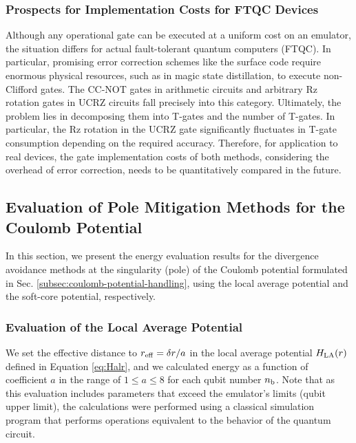 \documentclass[jctc-draft.tex]{subfiles}
\begin{document}
\subsubsection{Prospects for Implementation Costs for FTQC Devices}
Although any operational gate can be executed at a uniform cost on an emulator,
the situation differs for actual fault-tolerant quantum computers (FTQC). In
particular, promising error correction schemes like the surface code require
enormous physical resources, such as in magic state distillation, to execute
non-Clifford gates. The CC-NOT gates in arithmetic circuits and arbitrary Rz
rotation gates in UCRZ circuits fall precisely into this category. Ultimately,
the problem lies in decomposing them into T-gates and the number of T-gates. In
particular, the Rz rotation in the UCRZ gate significantly fluctuates in T-gate
consumption depending on the required accuracy. Therefore, for application to
real devices, the gate implementation costs of both methods, considering the
overhead of error correction, needs to be quantitatively compared in the future.


\subsection{Evaluation of Pole Mitigation Methods for the Coulomb Potential}
\label{subsec:coulomb-potential-handling-results}
In this section, we present the energy evaluation results for the divergence
avoidance methods at the singularity (pole) of the Coulomb potential formulated
in Sec. \ref{subsec:coulomb-potential-handling}, using the local
average potential and the soft-core potential, respectively.

\subsubsection{Evaluation of the Local Average Potential}
\label{subsubsec:local-average-potential-results}

We set the effective distance to $r_{\mathrm{eff}} = \delta r/a$ in the local average
potential $H_{\mathrm{LA}}(r)$ defined in Equation \eqref{eq:Halr}, and we calculated
energy as a function of coefficient $a$ in the range of $1 \le a \le 8$ for
each qubit number $n_{\mathrm{b}}$. Note that as this evaluation includes parameters
that exceed the emulator's limits (qubit upper limit), the calculations were
performed using a classical simulation program that performs operations
equivalent to the behavior of the quantum circuit.
\end{document}
